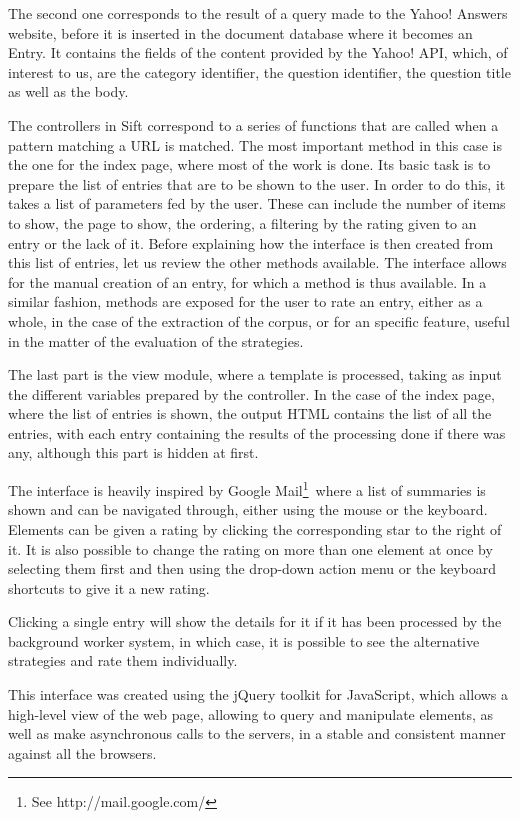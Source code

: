 The second one corresponds to the result of a query made to the Yahoo! Answers website, before it is inserted in the document database where it becomes an Entry. It contains the fields of the content provided by the Yahoo! API, which, of interest to us, are the category identifier, the question identifier, the question title as well as the body.

The controllers in Sift correspond to a series of functions that are called when a pattern matching a URL is matched. The most important method in this case is the one for the index page, where most of the work is done. Its basic task is to prepare the list of entries that are to be shown to the user. In order to do this, it takes a list of parameters fed by the user. These can include the number of items to show, the page to show, the ordering, a filtering by the rating given to an entry or the lack of it. Before explaining how the interface is then created from this list of entries, let us review the other methods available. The interface allows for the manual creation of an entry, for which a method is thus available. In a similar fashion, methods are exposed for the user to rate an entry, either as a whole, in the case of the extraction of the corpus, or for an specific feature, useful in the matter of the evaluation of the strategies.

The last part is the view module, where a template is processed, taking as input the different variables prepared by the controller. In the case of the index page, where the list of entries is shown, the output HTML contains the list of all the entries, with each entry containing the results of the processing done if there was any, although this part is hidden at first.

The interface is heavily inspired by Google Mail\footnote{See http://mail.google.com/}\ where a list of summaries is shown and can be navigated through, either using the mouse or the keyboard. Elements can be given a rating by clicking the corresponding star to the right of it. It is also possible to change the rating on more than one element at once by selecting them first and then using the drop-down action menu or the keyboard shortcuts to give it a new rating.

Clicking a single entry will show the details for it if it has been processed by the background worker system, in which case, it is possible to see the alternative strategies and rate them individually.

This interface was created using the jQuery toolkit for JavaScript, which allows a high-level view of the web page, allowing to query and manipulate elements, as well as make asynchronous calls to the servers, in a stable and consistent manner against all the browsers.

